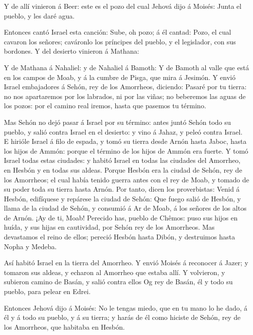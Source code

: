 Y de allí vinieron á Beer: este es el pozo del cual Jehová
dijo á Moisés: Junta el pueblo, y les daré agua.

 Entonces cantó Israel esta canción: Sube, oh pozo; á él
cantad:  Pozo, el cual cavaron los señores; caváronlo los
príncipes del pueblo, y el legislador, con sus bordones. Y del desierto
vinieron á Mathana:

 Y de Mathana á Nahaliel: y de Nahaliel á Bamoth:
 Y de Bamoth al valle que está en los campos de Moab, y á
la cumbre de Pisga, que mira á Jesimón.  Y envió Israel
embajadores á Sehón, rey de los Amorrheos, diciendo: 
Pasaré por tu tierra: no nos apartaremos por los labrados, ni por las
viñas; no beberemos las aguas de los pozos: por el camino real iremos,
hasta que pasemos tu término.

 Mas Sehón no dejó pasar á Israel por su término: antes
juntó Sehón todo su pueblo, y salió contra Israel en el desierto: y vino
á Jahaz, y peleó contra Israel.  E hirióle Israel á filo de
espada, y tomó su tierra desde Arnón hasta Jaboc, hasta los hijos de
Ammón: porque el término de los hijos de Ammón era fuerte. 
Y tomó Israel todas estas ciudades: y habitó Israel en todas las
ciudades del Amorrheo, en Hesbón y en todas sus aldeas. 
Porque Hesbón era la ciudad de Sehón, rey de los Amorrheos; el cual
había tenido guerra antes con el rey de Moab, y tomado de su poder toda
su tierra hasta Arnón.  Por tanto, dicen los proverbistas:
Venid á Hesbón, edifíquese y repárese la ciudad de Sehón: 
Que fuego salió de Hesbón, y llama de la ciudad de Sehón, y consumió á
Ar de Moab, á los señores de los altos de Arnón.  ¡Ay de
ti, Moab! Perecido has, pueblo de Chêmos: puso sus hijos en huída, y sus
hijas en cautividad, por Sehón rey de los Amorrheos.  Mas
devastamos el reino de ellos; pereció Hesbón hasta Dibón, y destruimos
hasta Nopha y Medeba.

 Así habitó Israel en la tierra del Amorrheo. 
Y envió Moisés á reconocer á Jazer; y tomaron sus aldeas, y echaron al
Amorrheo que estaba allí.  Y volvieron, y subieron camino
de Basán, y salió contra ellos Og rey de Basán, él y todo su pueblo,
para pelear en Edrei.

 Entonces Jehová dijo á Moisés: No le tengas miedo, que en
tu mano lo he dado, á él y á todo su pueblo, y á su tierra; y harás de
él como hiciste de Sehón, rey de los Amorrheos, que habitaba en Hesbón.

